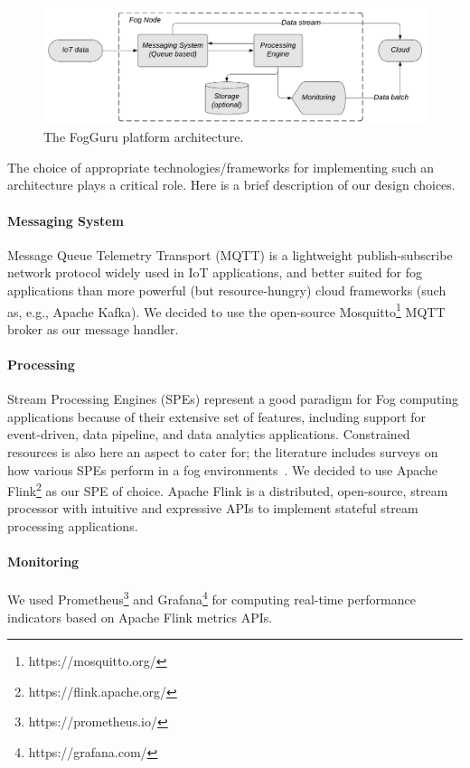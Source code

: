 \begin{figure}[htbp]
\centerline{
\includegraphics[width=1\linewidth]{figures/fog_components.pdf}}
\caption{The FogGuru platform architecture.}
\label{fig:node-arch}
\end{figure}

The choice of appropriate technologies/frameworks for implementing such an architecture plays a critical role. Here is a brief description of our design choices.
\paragraph*{Messaging System}
Message Queue Telemetry Transport (MQTT) is a lightweight publish-subscribe network protocol widely used in IoT applications, and better suited for fog applications than more powerful (but resource-hungry) cloud frameworks (such as, e.g., Apache Kafka). We decided to use the open-source Mosquitto\footnote{https://mosquitto.org/} MQTT broker as our message handler.

\paragraph*{Processing}
Stream Processing Engines (SPEs) represent a good paradigm for Fog computing applications because of their extensive set of features, including support for event-driven, data pipeline, and data analytics applications. Constrained resources is also here an aspect to cater for; the literature includes surveys on how various SPEs perform in a fog environments~\cite{lee2017data,zeuch2019analyzing}. We decided to use Apache Flink\footnote{https://flink.apache.org/} as our SPE of choice. Apache Flink is a distributed, open-source, stream processor with intuitive and expressive APIs to implement stateful stream processing applications.

\paragraph*{Monitoring}
We used Prometheus\footnote{https://prometheus.io/} and Grafana\footnote{https://grafana.com/} for computing real-time performance indicators based on Apache Flink metrics APIs.

